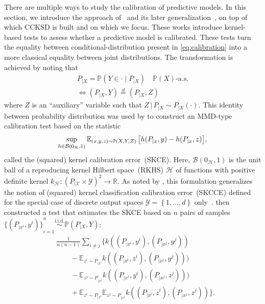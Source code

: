 \documentclass{uai2023} %
\begin{document}
There are multiple ways to study the calibration of predictive models.
In this section, we introduce the approach of~\citet{widmann2019calibration} and its later generalization~\citep{widmann2022calibration}, on top of which CCKSD is built and on which we focus.
These works introduce kernel-based tests to assess whether a predictive model is calibrated.
These tests turn the equality between conditional-distribution present in \cref{eq:calibration} into a more classical equality between joint distributions.
The transformation is achieved by noting that
\begin{multline}\label{eq:calibration2}
P_{|X} = \mathbb{P}\left(Y \in \cdot \mid P_{|X} \right) \quad \mathbb{P}(X)\text{-a.s.} \\
\iff (P_{|X}, Y) \stackrel{d}{=} (P_{|X}, Z)
\end{multline}
where $Z$ is an ``auxiliary'' variable such that $Z \,|\, P_{|X} \sim P_{|X}(\cdot)$.
This identity between probability distribution was used by \citet{widmann2022calibration} to construct an MMD-type calibration test based on the statistic
\begin{equation}\label{eq:SKCE}
\sup_{h \in \mathcal  B(0_\mathcal{H}, 1)} \operatorname{\mathbb{E}}_{(x, y, z) \sim \mathbb{P}(X, Y, Z)} \big[h(P_{|x}, y) - h(P_{|x}, z) \big],
\end{equation}
called the (squared) kernel calibration error~(SKCE).
Here, $\mathcal{B}(0_\mathcal{H}, 1)$ is the unit ball of a reproducing kernel Hilbert space~(RKHS) $\mathcal H$ of functions with positive definite kernel $k_{\mathcal{H}} \colon (P_ {|\mathcal{X}} \times \mathcal{Y})^2  \to \mathbb{R}$.
As noted by \citet{widmann2022calibration}, this formulation generalizes the notion of (squared) kernel classification calibration error~(SKCCE) defined for the special case of discrete output spaces $\mathcal{Y} = \left \{ 1, \dots, d \right \}$  only~\citep{widmann2019calibration}.
\citet{widmann2022calibration} then constructed a test that estimates the SKCE based on $n$ pairs of samples ${\{(P_{|x^i}, y^i)\}}_{i=1}^n \stackrel{\text{i.i.d.}}{\sim} \mathbb{P}(P_{|X}, Y)$:
\begin{equation} \label{eq:SCKE-u-statistics-estimator}
\begin{split}
    &\frac{1}{n(n-1)} \sum\limits_{i \neq j} \Big \{ k((P_{|x^i}, y^i), (P_{|x^j}, y^j)) \\
    & \qquad - \mathbb{E}_{z^i \sim P_{|x^i}} k((P_{|x^i}, z^i), (P_{|x^j}, y^j)) ) \\
    & \qquad - \mathbb{E}_{z^j \sim P_{|x^j}} k((P_{|x^i}, y^i), (P_{|x^j}, z^j))) \\
    & \qquad + \mathbb{E}_{z^i \sim P_{|x^i}} \mathbb{E}_{z^j \sim P_{|x^j}} k((P_{|x^i}, z^i), (P_{|x^j}, z^j)) \Big\}.
\end{split}
\end{equation}
\end{document}
